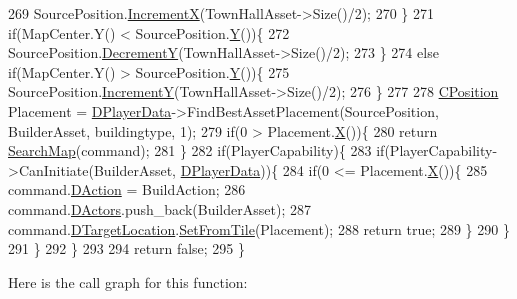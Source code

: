 \begin{DoxyCode}
269             SourcePosition.\hyperlink{classCPosition_aa5955d67d5ab7ca74d80cb7303b6eaa9}{IncrementX}(TownHallAsset->Size()/2);
270         \}
271         \textcolor{keywordflow}{if}(MapCenter.Y() < SourcePosition.\hyperlink{classCPosition_a1aa8a30e2f08dda1f797736ba8c13a87}{Y}())\{
272             SourcePosition.\hyperlink{classCPosition_a51ee44d9e0457d6277567fd8a66fdec7}{DecrementY}(TownHallAsset->Size()/2);   
273         \}
274         \textcolor{keywordflow}{else} \textcolor{keywordflow}{if}(MapCenter.Y() > SourcePosition.\hyperlink{classCPosition_a1aa8a30e2f08dda1f797736ba8c13a87}{Y}())\{
275             SourcePosition.\hyperlink{classCPosition_a3f2a26798bb27b1252ff1be303b3adfc}{IncrementY}(TownHallAsset->Size()/2);
276         \}
277 
278         \hyperlink{classCPosition}{CPosition} Placement = \hyperlink{classCAIPlayer_a83b5113c8f7e80df54940b647c5ee2e6}{DPlayerData}->FindBestAssetPlacement(SourcePosition, 
      BuilderAsset, buildingtype, 1);
279         \textcolor{keywordflow}{if}(0 > Placement.\hyperlink{classCPosition_a9a6b94d3b91df1492d166d9964c865fc}{X}())\{
280             \textcolor{keywordflow}{return} \hyperlink{classCAIPlayer_afafbe8fc589e09a16ae1f02f2794d7b0}{SearchMap}(command);
281         \}
282         \textcolor{keywordflow}{if}(PlayerCapability)\{
283             \textcolor{keywordflow}{if}(PlayerCapability->CanInitiate(BuilderAsset, \hyperlink{classCAIPlayer_a83b5113c8f7e80df54940b647c5ee2e6}{DPlayerData}))\{
284                 \textcolor{keywordflow}{if}(0 <= Placement.\hyperlink{classCPosition_a9a6b94d3b91df1492d166d9964c865fc}{X}())\{
285                     command.\hyperlink{structSPlayerCommandRequest_a80897bbccf2c4e0b148a7aa815a926c6}{DAction} = BuildAction;
286                     command.\hyperlink{structSPlayerCommandRequest_aa37fc01519676345703d78b9f573894a}{DActors}.push\_back(BuilderAsset);
287                     command.\hyperlink{structSPlayerCommandRequest_a701702b94ca2fd2738e95ef6711dd41a}{DTargetLocation}.\hyperlink{classCPosition_a46994e6a8b8e3b4237edd7259ad844b6}{SetFromTile}(Placement);
288                     \textcolor{keywordflow}{return} \textcolor{keyword}{true};
289                 \}
290             \}
291         \}
292     \}
293 
294     \textcolor{keywordflow}{return} \textcolor{keyword}{false};
295 \}
\end{DoxyCode}
Here is the call graph for this function\+:
\nopagebreak
